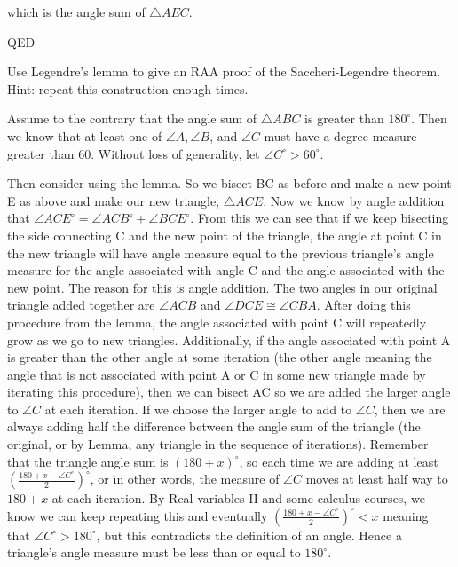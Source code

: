 \documentclass[12pt,letterpaper]{article}
\newcommand{\Proof}{\noindent {\bf Proof: }}
\newcommand{\QED}{\begin{flushright}QED\end{flushright}}
\begin{document}
which is the angle sum of $\triangle AEC$.

\QED


Use Legendre's lemma to give an RAA proof of the Saccheri-Legendre theorem.  Hint: repeat this construction enough times. \\

\Proof

Assume to the contrary that the angle sum of $\triangle ABC$ is greater than $180^\circ$.  Then we know that at least one of $\angle A, \angle B$, and $\angle C$ must have a degree measure greater than 60.  Without loss of generality, let $\angle C^\circ > 60^\circ$.

Then consider using the lemma.  So we bisect BC as before and make a new point E as above and make our new triangle, $\triangle ACE$.  Now we know by angle addition that $\angle ACE^\circ = \angle ACB^\circ + \angle BCE^\circ$.  From this we can see that if we keep bisecting the side connecting C and the new point of the triangle, the angle at point C in the new triangle will have angle measure equal to the previous triangle's angle measure for the angle associated with angle C and the angle associated with the new point. The reason for this is angle addition.  The two angles in our original triangle added together are $\angle ACB$ and $\angle DCE \cong \angle CBA$. After doing this procedure from the lemma, the angle associated with point C will repeatedly grow as we go to new triangles.  Additionally, if the angle associated with point A is greater than the other angle at some iteration (the other angle meaning the angle that is not associated with point A or C in some new triangle made by iterating this procedure), then we can bisect AC so we are added the larger angle to $\angle C$ at each iteration.  If we choose the larger angle to add to $\angle C$, then we are always adding half the difference between the angle sum of the triangle (the original, or by Lemma, any triangle in the sequence of iterations).  Remember that the triangle angle sum is $(180 + x)^\circ$, so each time we are adding at least $(\frac{180 + x - \angle C^\circ}{2})^\circ$, or in other words, the measure of $\angle C$ moves at least half way to $180 + x$ at each iteration.  By Real variables II and some calculus courses, we know we can keep repeating this and eventually $(\frac{180 + x - \angle C^\circ}{2})^\circ < x$ meaning that $\angle C^\circ > 180^\circ$, but this contradicts the definition of an angle. Hence a triangle's angle measure must be less than or equal to $180^\circ$.
 
\end{document}
